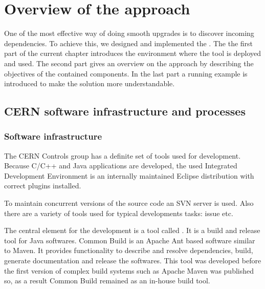 \chapter{Overview of the approach}

One of the most effective  way of doing
smooth upgrades is to discover incoming dependencies. To achieve this, we
designed and implemented the \ptool{}. The the first part of the current chapter
introduces the environment where the tool is deployed and used. The second part
gives an overview on the \ptool{} approach by describing the objectives of the
contained components. In the last part a running example is introduced to make
the solution more understandable.


\section{CERN software infrastructure and processes}\label{sect:cerninf}

\subsection{Software infrastructure}

The CERN Controls group has a definite set of tools used for development. Because
C/C++ and Java applications are developed, the used Integrated Development
Environment is an internally maintained Eclipse distribution with correct
plugins installed.

To maintain concurrent versions of the source code an SVN server is used. Also
there are a variety of tools used for typical developments tasks: issue
etc. 

The central element for the development is a tool called 
\cite{CommonBuild}. It is a build and release tool for Java softwares. Common
Build is an Apache Ant based software similar to Maven. It provides
functionality to describe and resolve dependencies, build, generate
documentation and release the softwares. This tool was developed before the
first version of complex build systems such as Apache Maven was published so,
as a result 
Common Build remained as an in-house build tool. 

